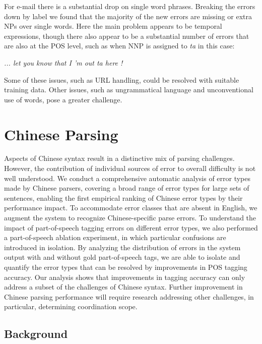 \begin{landscape}

\end{landscape}

For e-mail there is a substantial drop on single word phrases.  Breaking the
errors down by label we found that the majority of the new errors are missing
or extra NPs over single words.  Here the main problem appears to be temporal
expressions, though there also appear to be a substantial number of errors that
are also at the POS level, such as when NNP is assigned to \emph{ta} in this
case:

\vspace{3mm}
\emph{... let you know that I 'm out ta here !}
\vspace{3mm}

Some of these issues, such as URL handling, could be resolved with suitable
training data.  Other issues, such as ungrammatical language and
unconventional use of words, pose a greater challenge.

\section{Chinese Parsing}

Aspects of Chinese syntax result in a distinctive mix of parsing challenges.
However, the contribution of individual sources of error to overall difficulty is not well understood.  
We conduct a comprehensive automatic analysis of error types made by Chinese parsers, covering a broad range of error types for large sets of sentences, enabling the first empirical ranking of Chinese error types by their performance impact.  
To accommodate error classes that are absent in English, we augment the system to recognize Chinese-specific parse errors.
To understand the impact of part-of-speech tagging errors on different error types, we also performed a part-of-speech ablation experiment, in which particular confusions are introduced in isolation.
By analyzing the distribution of errors in the system output with and without gold part-of-speech tags, we are able to isolate and quantify the error types that can be resolved by improvements in POS tagging accuracy.
Our analysis shows that improvements in tagging accuracy can only address a subset of the challenges of Chinese syntax.
Further improvement in Chinese parsing performance will require research addressing other challenges, in particular, determining coordination scope.

\subsection{Background}

